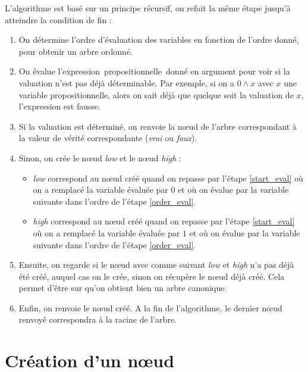 \documentclass[a4paper, oneside]{report}
\newcommand{\expp}{expression~propositionnelle~}
\begin{document}
L'algorithme est basé sur un principe récursif, on refait la même étape jusqu'à atteindre la condition de fin :
\begin{enumerate}
\item \label{order_eval} On détermine l'ordre d'évaluation des variables en fonction de l'ordre donné, pour obtenir un arbre ordonné.
\item \label{start_eval} On évalue l'\expp donné en argument pour voir si la valuation n'est pas déjà déterminable. Par exemple, si on a $0 \wedge x$ avec $x$ une variable propositionnelle, alors on sait déjà que quelque soit la valuation de $x$, l'expression est fausse.
\item Si la valuation est déterminé, on renvoie la nœud de l'arbre correspondant à la valeur de vérité correspondante (\textit{vrai} ou \textit{faux}).
\item Sinon, on crée le nœud \textit{low} et le nœud \textit{high} : 
 \begin{itemize}
\item \textit{low} correspond au nœud créé quand on repasse par l'étape \ref{start_eval} où on a remplacé la variable évaluée par $0$ et où on évalue par la variable suivante dans l'ordre de l'étape \ref{order_eval}.
\item \textit{high} correspond au nœud créé quand on repasse par l'étape \ref{start_eval} où on a remplacé la variable évaluée par $1$ et où on évalue par la variable suivante dans l'ordre de l'étape \ref{order_eval}.
\end{itemize}
\item Ensuite, on regarde si le nœud avec comme suivant \textit{low} et \textit{high} n'a pas déjà été créé, auquel cas on le crée, sinon on récupère le nœud déjà créé. Cela permet d'être sur qu'on obtient bien un arbre canonique.
\item Enfin, on renvoie le nœud créé. A la fin de l'algorithme, le dernier nœud renvoyé correspondra à la racine de l'arbre.
\end{enumerate}

\section{Création d'un nœud}
\end{document}
